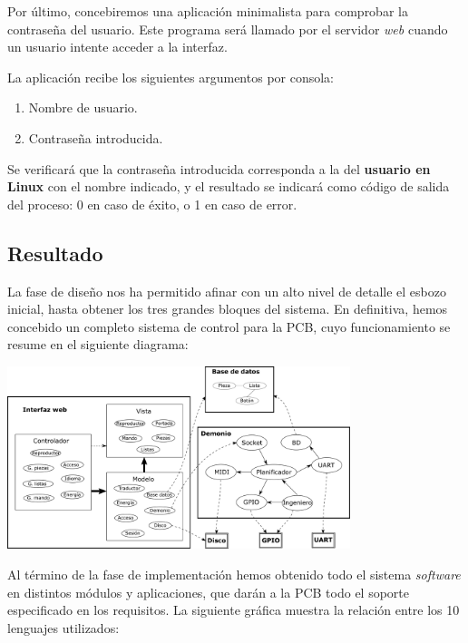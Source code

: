 \documentclass[10pt,a4paper]{article}
\begin{document}
	Por último, concebiremos una aplicación minimalista para comprobar la contraseña del usuario. Este programa será llamado por el servidor \textit{web} cuando un usuario intente acceder a la interfaz.
	
	La aplicación recibe los siguientes argumentos por consola:
	
	\begin{enumerate}
		\item Nombre de usuario.
		\item Contraseña introducida.
	\end{enumerate}
	
	Se verificará que la contraseña introducida corresponda a la del \textbf{usuario en Linux} con el nombre indicado, y el resultado se indicará como código de salida del proceso: 0 en caso de éxito, o 1 en caso de error.
	
	\subsection{Resultado}
	
	La fase de diseño nos ha permitido afinar con un alto nivel de detalle el esbozo inicial, hasta obtener los tres grandes bloques del sistema. En definitiva, hemos concebido un completo sistema de control para la PCB, cuyo funcionamiento se resume en el siguiente diagrama:
	
	\begin{center}
		\includegraphics[width=0.75\textwidth]{images/sistema} 
	\end{center}
	
	Al término de la fase de implementación hemos obtenido todo el sistema \textit{software} en distintos módulos y aplicaciones, que darán a la PCB todo el soporte especificado en los requisitos. La siguiente gráfica muestra la relación entre los 10 lenguajes utilizados:
	
\end{document}
